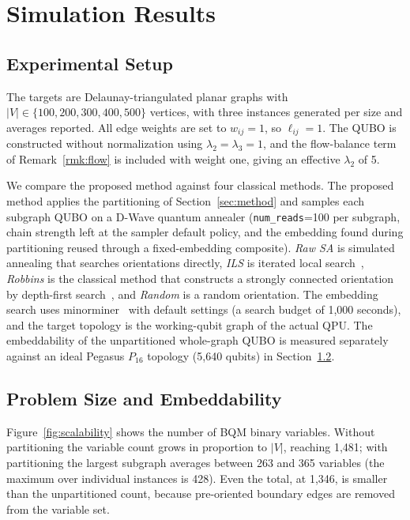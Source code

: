 \documentclass[twocolumn,a4paper]{article}
\begin{document}
\section{Simulation Results} \label{sec:result}

\subsection{Experimental Setup}

The targets are Delaunay-triangulated planar graphs with \(|V|\in\{100,200,300,400,500\}\) vertices, with three instances generated per size and averages reported. All edge weights are set to \(w_{ij}=1\), so \(\ell_{ij}=1\). The QUBO is constructed without normalization using \(\lambda_2=\lambda_3=1\), and the flow-balance term of Remark~\ref{rmk:flow} is included with weight one, giving an effective \(\lambda_2\) of 5.

We compare the proposed method against four classical methods. The proposed method applies the partitioning of Section~\ref{sec:method} and samples each subgraph QUBO on a D-Wave quantum annealer (\texttt{num\_reads}=100 per subgraph, chain strength left at the sampler default policy, and the embedding found during partitioning reused through a fixed-embedding composite). \emph{Raw SA} is simulated annealing that searches orientations directly, \emph{ILS} is iterated local search~\cite{duhamel2024strong}, \emph{Robbins} is the classical method that constructs a strongly connected orientation by depth-first search~\cite{robbins1939theorem}, and \emph{Random} is a random orientation. The embedding search uses minorminer~\cite{cai2014practical} with default settings (a search budget of 1{,}000 seconds), and the target topology is the working-qubit graph of the actual QPU. The embeddability of the unpartitioned whole-graph QUBO is measured separately against an ideal Pegasus \(P_{16}\) topology (5{,}640 qubits) in Section~\ref{subsec:result_embed}.

\subsection{Problem Size and Embeddability} \label{subsec:result_embed}

Figure~\ref{fig:scalability} shows the number of BQM binary variables. Without partitioning the variable count grows in proportion to \(|V|\), reaching 1{,}481; with partitioning the largest subgraph averages between 263 and 365 variables (the maximum over individual instances is 428). Even the total, at 1{,}346, is smaller than the unpartitioned count, because pre-oriented boundary edges are removed from the variable set.
\end{document}
